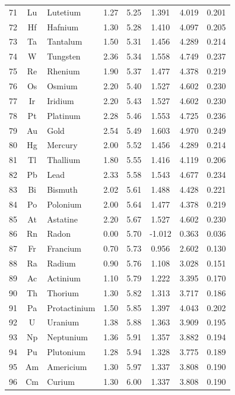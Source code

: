 \documentclass[12pt,a4paper]{article}
\theoremstyle{remark}
\begin{document}
\begin{longtable}{|c|c|p{2.5cm}|c|c|c|c|c|}
		71 & Lu & Lutetium & 1.27 & 5.25 & 1.391 & 4.019 & 0.201 \\
		72 & Hf & Hafnium & 1.30 & 5.28 & 1.410 & 4.097 & 0.205 \\
		73 & Ta & Tantalum & 1.50 & 5.31 & 1.456 & 4.289 & 0.214 \\
		74 & W & Tungsten & 2.36 & 5.34 & 1.558 & 4.749 & 0.237 \\
		75 & Re & Rhenium & 1.90 & 5.37 & 1.477 & 4.378 & 0.219 \\
		76 & Os & Osmium & 2.20 & 5.40 & 1.527 & 4.602 & 0.230 \\
		77 & Ir & Iridium & 2.20 & 5.43 & 1.527 & 4.602 & 0.230 \\
		78 & Pt & Platinum & 2.28 & 5.46 & 1.553 & 4.725 & 0.236 \\
		79 & Au & Gold & 2.54 & 5.49 & 1.603 & 4.970 & 0.249 \\
		80 & Hg & Mercury & 2.00 & 5.52 & 1.456 & 4.289 & 0.214 \\
		81 & Tl & Thallium & 1.80 & 5.55 & 1.416 & 4.119 & 0.206 \\
		82 & Pb & Lead & 2.33 & 5.58 & 1.543 & 4.677 & 0.234 \\
		83 & Bi & Bismuth & 2.02 & 5.61 & 1.488 & 4.428 & 0.221 \\
		84 & Po & Polonium & 2.00 & 5.64 & 1.477 & 4.378 & 0.219 \\
		85 & At & Astatine & 2.20 & 5.67 & 1.527 & 4.602 & 0.230 \\
		86 & Rn & Radon & 0.00 & 5.70 & -1.012 & 0.363 & 0.036 \\
		87 & Fr & Francium & 0.70 & 5.73 & 0.956 & 2.602 & 0.130 \\
		88 & Ra & Radium & 0.90 & 5.76 & 1.108 & 3.028 & 0.151 \\
		89 & Ac & Actinium & 1.10 & 5.79 & 1.222 & 3.395 & 0.170 \\
		90 & Th & Thorium & 1.30 & 5.82 & 1.313 & 3.717 & 0.186 \\
		91 & Pa & Protactinium & 1.50 & 5.85 & 1.397 & 4.043 & 0.202 \\
		92 & U & Uranium & 1.38 & 5.88 & 1.363 & 3.909 & 0.195 \\
		93 & Np & Neptunium & 1.36 & 5.91 & 1.357 & 3.882 & 0.194 \\
		94 & Pu & Plutonium & 1.28 & 5.94 & 1.328 & 3.775 & 0.189 \\
		95 & Am & Americium & 1.30 & 5.97 & 1.337 & 3.808 & 0.190 \\
		96 & Cm & Curium & 1.30 & 6.00 & 1.337 & 3.808 & 0.190 \\

\end{longtable}
\end{document}
